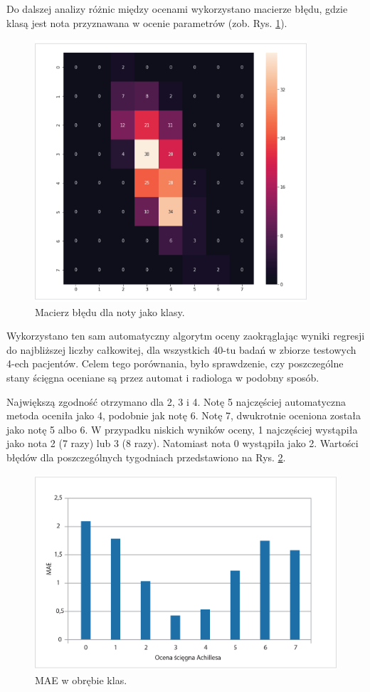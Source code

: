 Do dalszej analizy różnic między ocenami wykorzystano macierze błędu, gdzie klasą jest nota przyznawana w ocenie parametrów (zob. Rys. \ref{fig:cmscores}).   
\begin{figure}[h]
	\centering
	\includegraphics[width=0.9\textwidth]{figures/cmScores.jpg}
	\caption{Macierz błędu dla noty jako klasy.}\label{fig:cmscores}
\end{figure}
Wykorzystano ten sam automatyczny algorytm oceny zaokrąglając wyniki regresji do najbliższej liczby całkowitej, dla wszystkich 40-tu badań w zbiorze testowych 4-ech pacjentów. Celem tego porównania, było sprawdzenie, czy poszczególne stany ścięgna oceniane są przez automat i radiologa w podobny sposób.

Największą zgodność otrzymano dla 2, 3 i 4. Notę 5 najczęściej automatyczna metoda oceniła jako 4, podobnie jak notę 6. Notę 7, dwukrotnie oceniona została jako notę 5 albo 6. W przypadku niskich wyników oceny, 1 najczęściej wystąpiła jako nota 2 (7 razy) lub 3 (8 razy). Natomiast nota 0 wystąpiła jako 2. Wartości błędów dla poszczególnych tygodniach przedstawiono na Rys. \ref{fig:cmscores_summary}.

\begin{figure}[h]
	\centering
	\includegraphics[width=1\textwidth]{figures/cmScores_summary.jpg}
	\caption{MAE w obrębie klas.}\label{fig:cmscores_summary}
\end{figure}

